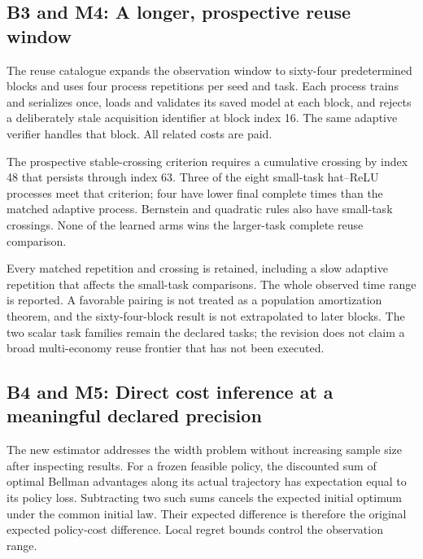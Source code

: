 \hypertarget{b3-and-m4-a-longer-prospective-reuse-window}{%
\subsection{B3 and M4: A longer, prospective reuse
window}\label{b3-and-m4-a-longer-prospective-reuse-window}}

The reuse catalogue expands the observation window to sixty-four
predetermined blocks and uses four process repetitions per seed and
task. Each process trains and serializes once, loads and validates its
saved model at each block, and rejects a deliberately stale acquisition
identifier at block index 16. The same adaptive verifier handles that
block. All related costs are paid.

The prospective stable-crossing criterion requires a cumulative crossing
by index 48 that persists through index 63. Three of the eight
small-task hat--ReLU processes meet that criterion; four have lower
final complete times than the matched adaptive process. Bernstein and
quadratic rules also have small-task crossings. None of the learned arms
wins the larger-task complete reuse comparison.

Every matched repetition and crossing is retained, including a slow
adaptive repetition that affects the small-task comparisons. The whole
observed time range is reported. A favorable pairing is not treated as a
population amortization theorem, and the sixty-four-block result is not
extrapolated to later blocks. The two scalar task families remain the
declared tasks; the revision does not claim a broad multi-economy reuse
frontier that has not been executed.

\hypertarget{b4-and-m5-direct-cost-inference-at-a-meaningful-declared-precision}{%
\subsection{B4 and M5: Direct cost inference at a meaningful declared
precision}\label{b4-and-m5-direct-cost-inference-at-a-meaningful-declared-precision}}

The new estimator addresses the width problem without increasing sample
size after inspecting results. For a frozen feasible policy, the
discounted sum of optimal Bellman advantages along its actual trajectory
has expectation equal to its policy loss. Subtracting two such sums
cancels the expected initial optimum under the common initial law. Their
expected difference is therefore the original expected policy-cost
difference. Local regret bounds control the observation range.

